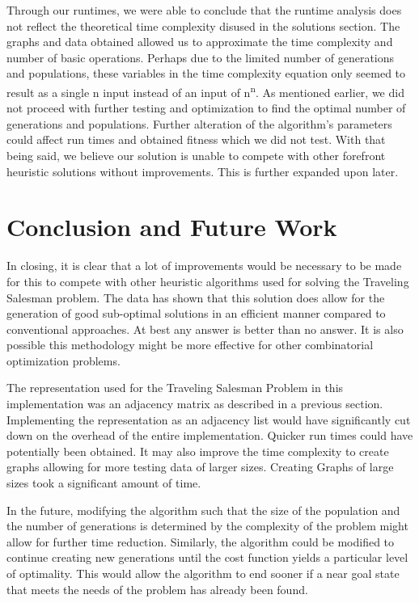 \documentclass[sigplan,screen]{acmart}
\begin{document}
Through our runtimes, we were able to conclude that the runtime analysis does
not reflect the theoretical time complexity disused in the solutions section.
The graphs and data obtained allowed us to approximate the time complexity and
number of basic operations. Perhaps due to the limited number of generations and
populations, these variables in the time complexity equation only seemed to
result as a single n input instead of an input of n\textsuperscript{n}. As
mentioned earlier, we did not proceed with further testing and optimization to
find the optimal number of generations and populations. Further alteration of
the algorithm's parameters could affect run times and obtained fitness which we
did not test. With that being said, we believe our solution is unable to compete
with other forefront heuristic solutions without improvements. This is further
expanded upon later.

\section{Conclusion and Future Work}
In closing, it is clear that a lot of improvements would be necessary to be made
for this to compete with other heuristic algorithms used for solving the
Traveling Salesman problem. The data has shown that this solution does allow for
the generation of good sub-optimal solutions in an efficient manner compared to
conventional approaches. At best any answer is better than no answer. It is also
possible this methodology might be more effective for other combinatorial
optimization problems.

The representation used for the Traveling Salesman Problem in this
implementation was an adjacency matrix as described in a previous section.
Implementing the representation as an adjacency list would have significantly
cut down on the overhead of the entire implementation. Quicker run times could
have potentially been obtained. It may also improve the time complexity to
create graphs allowing for more testing data of larger sizes. Creating Graphs of
large sizes took a significant amount of time.

In the future, modifying the algorithm such that the size of the population and
the number of generations is determined by the complexity of the problem might
allow for further time reduction. Similarly, the algorithm could be modified to
continue creating new generations until the cost function yields a particular
level of optimality. This would allow the algorithm to end sooner if a near goal
state that meets the needs of the problem has already been found.
\end{document}
